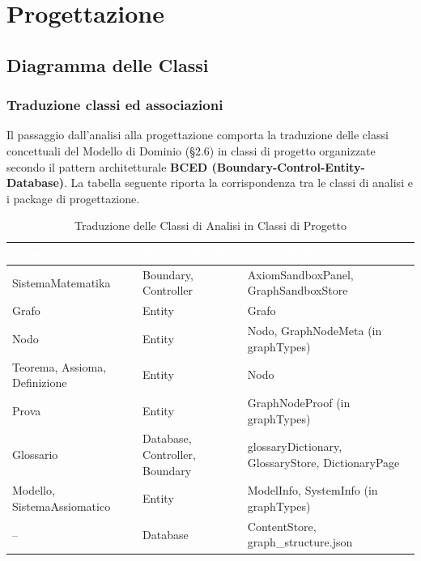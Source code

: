 \documentclass[12pt,a4paper]{article}
\begin{document}
\section{Progettazione}
\subsection{Diagramma delle Classi}

\subsubsection{Traduzione classi ed associazioni}
Il passaggio dall'analisi alla progettazione comporta la traduzione delle classi concettuali del Modello di Dominio (§2.6) in classi di progetto organizzate secondo il pattern architetturale \textbf{BCED (Boundary-Control-Entity-Database)}. La tabella seguente riporta la corrispondenza tra le classi di analisi e i package di progettazione.

\begin{table}[H]
    \centering
    \small
    \begin{tabularx}{\textwidth}{|l|l|X|}
        \hline
        \rowcolor{PrimaryBlue} \textcolor{white}{\textbf{Classe di Analisi}} & \textcolor{white}{\textbf{Package BCED}} & \textcolor{white}{\textbf{Classe di Progetto}} \\
        \hline
        SistemaMatematika & Boundary, Controller & AxiomSandboxPanel, GraphSandboxStore \\
        \hline
        \rowcolor{CodeBg} Grafo & Entity & Grafo \\
        \hline
        Nodo & Entity & Nodo, GraphNodeMeta (in graphTypes) \\
        \hline
        \rowcolor{CodeBg} Teorema, Assioma, Definizione & Entity & Nodo \\
        \hline
        Prova & Entity & GraphNodeProof (in graphTypes) \\
        \hline
        \rowcolor{CodeBg} Glossario & Database, Controller, Boundary & glossaryDictionary, GlossaryStore, DictionaryPage \\
        \hline
        Modello, SistemaAssiomatico & Entity & ModelInfo, SystemInfo (in graphTypes) \\
        \hline
        \rowcolor{CodeBg} -- & Database & ContentStore, graph\_structure.json \\
        \hline
    \end{tabularx}
    \caption{Traduzione delle Classi di Analisi in Classi di Progetto}
\end{table}
\end{document}
